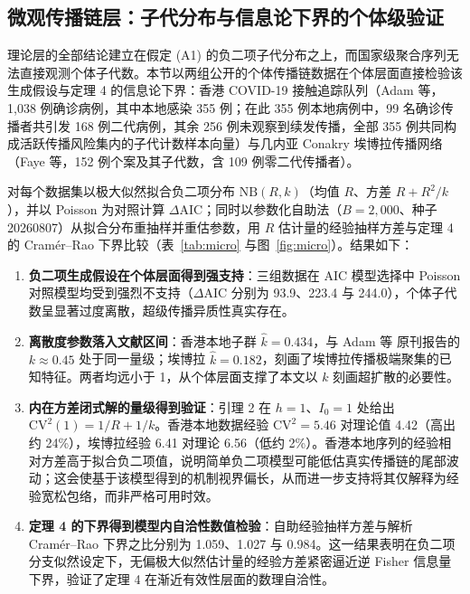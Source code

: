 \documentclass[11pt,a4paper]{article}
\theoremstyle{plain}
\theoremstyle{definition}
\begin{document}
\subsection{微观传播链层：子代分布与信息论下界的个体级验证}\label{sec:micro}

理论层的全部结论建立在假定 (A1) 的负二项子代分布之上，而国家级聚合序列无法直接观测个体子代数。本节以两组公开的个体传播链数据在个体层面直接检验该生成假设与定理 4 的信息论下界：香港 COVID-19 接触追踪队列（Adam 等\citep{adam2020clustering}，1,038 例确诊病例，其中本地感染 355 例；在此 355 例本地病例中，99 名确诊传播者共引发 168 例二代病例，其余 256 例未观察到续发传播，全部 355 例共同构成活跃传播风险集内的子代计数样本向量）与几内亚 Conakry 埃博拉传播网络（Faye 等\citep{faye2015chains}，152 例个案及其子代数，含 109 例零二代传播者）。

对每个数据集以极大似然拟合负二项分布 $\text{NB}(R,k)$（均值 $R$、方差 $R+R^2/k$），并以 Poisson 为对照计算 $\Delta\text{AIC}$；同时以参数化自助法（$B=2{,}000$、种子 20260807）从拟合分布重抽样并重估参数，用 $R$ 估计量的经验抽样方差与定理 4 的 Cramér--Rao 下界比较（表~\ref{tab:micro} 与图~\ref{fig:micro}）。结果如下：

\begin{enumerate}
\item \textbf{负二项生成假设在个体层面得到强支持}：三组数据在 AIC 模型选择中 Poisson 对照模型均受到强烈不支持（$\Delta\text{AIC}$ 分别为 93.9、223.4 与 244.0），个体子代数呈显著过度离散，超级传播异质性真实存在。
\item \textbf{离散度参数落入文献区间}：香港本地子群 $\hat{k} = 0.434$，与 Adam 等\citep{adam2020clustering} 原刊报告的 $k \approx 0.45$ 处于同一量级；埃博拉 $\hat{k} = 0.182$，刻画了埃博拉传播极端聚集的已知特征。两者均远小于 1，从个体层面支撑了本文以 $k$ 刻画超扩散的必要性。
\item \textbf{内在方差闭式解的量级得到验证}：引理 2 在 $h=1$、$I_0=1$ 处给出 $\text{CV}^2(1) = 1/R + 1/k$。香港本地数据经验 $\text{CV}^2 = 5.46$ 对理论值 4.42（高出约 24\%），埃博拉经验 6.41 对理论 6.56（低约 2\%）。香港本地序列的经验相对方差高于拟合负二项值，说明简单负二项模型可能低估真实传播链的尾部波动；这会使基于该模型得到的机制视界偏长，从而进一步支持将其仅解释为经验宽松包络，而非严格可用时效。
\item \textbf{定理 4 的下界得到模型内自洽性数值检验}：自助经验抽样方差与解析 Cramér--Rao 下界之比分别为 1.059、1.027 与 0.984。这一结果表明在负二项分支似然设定下，无偏极大似然估计量的经验方差紧密逼近逆 Fisher 信息量下界，验证了定理 4 在渐近有效性层面的数理自洽性。
\end{enumerate}
\end{document}
